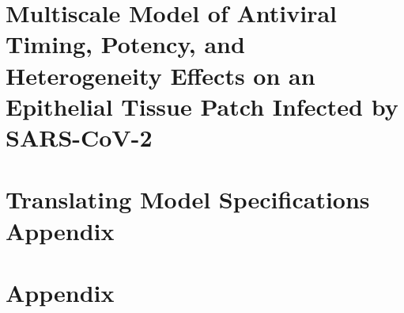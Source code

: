 \begin{appendices}
\begingroup
\renewcommand{\newpage}{}
\renewcommand{\cleardoublepage}{}
\renewcommand{\clearpage}{}
\let\cleardoublepage\relax
\let\clearpage\relax
\vspace{6em}
\appendixpage
\endgroup

\begingroup
\renewcommand{\newpage}{}
\renewcommand{\cleardoublepage}{}
\renewcommand{\clearpage}{}
\chapter{Multiscale Model of Antiviral Timing, Potency, and Heterogeneity Effects on an Epithelial Tissue Patch Infected by SARS-CoV-2}\label{cha:app:remdesivir}
\endgroup


\newpage
\chapter{Translating Model Specifications Appendix}\label{cha:app:translator}


\newpage
\chapter{\pcps Appendix}\label{cha:app:pheno}


\end{appendices}